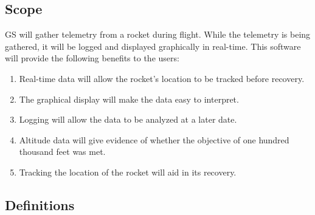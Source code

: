 \documentclass[10pt,draftclsnofoot,onecolumn]{IEEEtran}
\begin{document}
	\subsection{Scope}
	GS will gather telemetry from a rocket during flight.
	While the telemetry is being gathered, it will be logged and displayed graphically in real-time.
	This software will provide the following benefits to the users:
	\begin{enumerate}
		\item Real-time data will allow the rocket's location to be tracked before recovery.
		\item The graphical display will make the data easy to interpret.
		\item Logging will allow the data to be analyzed at a later date.
		\item Altitude data will give evidence of whether the objective of one hundred thousand feet was met.
		\item Tracking the location of the rocket will aid in its recovery.
	\end{enumerate}	
			
	\subsection{Definitions}
	
\end{document}

